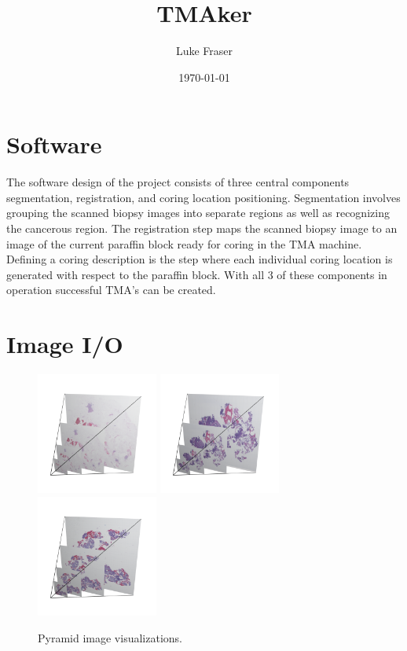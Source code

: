 \documentclass[a4paper,10pt,oneside]{article}
\author{Luke Fraser}
\title{TMAker}
\date{\today}
\begin{document}
\section{Software}
The software design of the project consists of three central components segmentation, registration, and coring location positioning. Segmentation involves grouping the scanned biopsy images into separate regions as well as recognizing the cancerous region. The registration step maps the scanned biopsy image to an image of the current paraffin block ready for coring in the TMA machine. Defining a coring description is the step where each individual coring location is generated with respect to the paraffin block. With all 3 of these components in operation successful TMA's can be created.

\section{Image I/O}

\begin{figure}[hbtp]
  \centering
  \includegraphics[width=4cm]{visualization/Pyramid_PO13-00516A1_1_7_201305171148.png}
  \includegraphics[width=4cm]{visualization/Pyramid_PO13-01710A1_1_5_201312260943.png}
  \includegraphics[width=4cm]{visualization/Pyramid_PO14-00472B13_1_7_201404151132.png}
  \caption{Pyramid image visualizations.}
  \label{fig:pyramidimage}
\end{figure}
\end{document}
